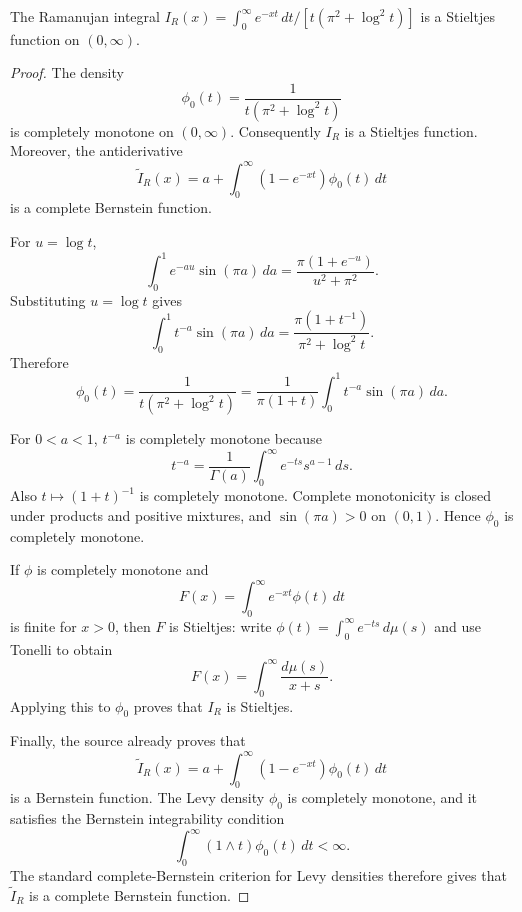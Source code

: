 \begin{lemma}
\label{res:ramanujan-integral-stieltjes}
The Ramanujan integral \(I_R(x)=\int_0^\infty e^{-xt}\,dt/[t(\pi^2+\log^2 t)]\) is a Stieltjes function on \((0,\infty)\).
\end{lemma}
\begin{proof}
The density
\[
\phi_0(t)=\frac{1}{t(\pi^2+\log^2 t)}
\]
is completely monotone on \((0,\infty)\). Consequently \(I_R\) is a Stieltjes function. Moreover, the antiderivative
\[
\widetilde I_R(x)=a+\int_0^\infty (1-e^{-xt})\phi_0(t)\,dt
\]
is a complete Bernstein function.

For \(u=\log t\),
\[
\int_0^1 e^{-au}\sin(\pi a)\,da
=\frac{\pi(1+e^{-u})}{u^2+\pi^2}.
\]
Substituting \(u=\log t\) gives
\[
\int_0^1 t^{-a}\sin(\pi a)\,da
=\frac{\pi(1+t^{-1})}{\pi^2+\log^2 t}.
\]
Therefore
\[
\phi_0(t)
=\frac{1}{t(\pi^2+\log^2 t)}
=\frac{1}{\pi(1+t)}\int_0^1 t^{-a}\sin(\pi a)\,da.
\]

For \(0<a<1\), \(t^{-a}\) is completely monotone because
\[
t^{-a}=\frac1{\Gamma(a)}\int_0^\infty e^{-ts}s^{a-1}\,ds.
\]
Also \(t\mapsto(1+t)^{-1}\) is completely monotone. Complete monotonicity is closed under products and positive mixtures, and \(\sin(\pi a)>0\) on \((0,1)\). Hence \(\phi_0\) is completely monotone.

If \(\phi\) is completely monotone and
\[
F(x)=\int_0^\infty e^{-xt}\phi(t)\,dt
\]
is finite for \(x>0\), then \(F\) is Stieltjes: write \(\phi(t)=\int_0^\infty e^{-ts}\,d\mu(s)\) and use Tonelli to obtain
\[
F(x)=\int_0^\infty\frac{d\mu(s)}{x+s}.
\]
Applying this to \(\phi_0\) proves that \(I_R\) is Stieltjes.

Finally, the source already proves that
\[
\widetilde I_R(x)=a+\int_0^\infty (1-e^{-xt})\phi_0(t)\,dt
\]
is a Bernstein function. The Levy density \(\phi_0\) is completely monotone, and it satisfies the Bernstein integrability condition
\[
\int_0^\infty (1\wedge t)\phi_0(t)\,dt<\infty.
\]
The standard complete-Bernstein criterion for Levy densities therefore gives that \(\widetilde I_R\) is a complete Bernstein function.
\end{proof}
